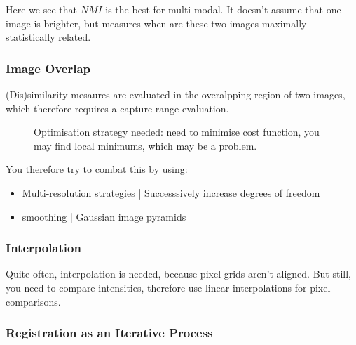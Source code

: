 \documentclass[11pt]{article}
\begin{document}
\begin{figure}[H]
    \centering
\end{figure}

Here we see that $NMI$ is the best for multi-modal. It doesn't assume that one image is brighter, but measures when are these two images maximally statistically related. 

\subsubsection{Image Overlap}

(Dis)similarity mesaures are evaluated in the overalpping region of two images, which therefore requires a capture range evaluation.

\begin{figure}[H]
    \centering
    \caption*{Optimisation strategy needed: need to minimise cost function, you may find local minimums, which may be a problem.}
\end{figure}

You therefore try to combat this by using:

\begin{itemize}
    \item Multi-resolution strategies | Successsively increase degrees of freedom
    \item smoothing | Gaussian image pyramids
\end{itemize}

\subsubsection{Interpolation}

\begin{figure}[H]
    \centering
\end{figure}

Quite often, interpolation is needed, because pixel grids aren't aligned. But still, you need to compare intensities, therefore use linear interpolations for pixel comparisons.

\subsubsection{Registration as an Iterative Process}
\end{document}
